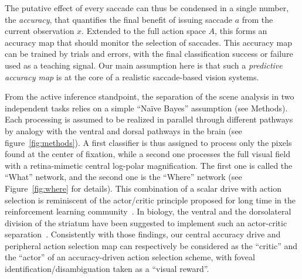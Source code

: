 The putative effect of every saccade can thus be condensed in a single number, the \emph{accuracy}, that quantifies the final benefit of issuing saccade $a$ %
from the current observation $x$. %
 Extended to the full action space $A$, this forms an accuracy map that should monitor the selection of saccades. %
This accuracy map can be trained by trials and errors, with the final classification success or failure used as a teaching signal. Our main assumption here is that such a \emph{predictive accuracy map} is at the core of a realistic saccade-based vision systems.

From the active inference standpoint, the separation of the scene analysis in two independent tasks relies on a simple ``Naïve Bayes'' assumption (see Methods).
Each processing is assumed to be realized in parallel through different pathways by analogy with the ventral and dorsal pathways in the brain (see figure~\ref{fig:methods}).
A first classifier is thus assigned to process only the pixels found at the center of fixation, while a second one processes the full visual field with a retina-mimetic central log-polar magnification. The first one is called the ``What'' network, and the second one is the ``Where'' network (see Figure~\ref{fig:where} for details).
This combination of a scalar drive with action selection is reminiscent of the actor/critic principle proposed for long time in the reinforcement learning community~\cite{sutton1998reinforcement}. In biology, the ventral and the dorsolateral division of the striatum have been suggested to implement such an actor-critic separation~\cite{joel2002actor, takahashi2008silencing}. Consistently with those findings, our central accuracy drive and peripheral action selection map can respectively be considered as the ``critic'' and the ``actor'' of an accuracy-driven action selection scheme, with foveal identification/disambiguation taken as a ``visual reward''.

